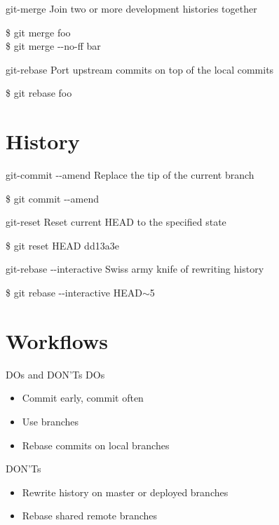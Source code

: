\documentclass{beamer}
\begin{document}
\begin{frame}{git-merge}
  Join two or more development histories together
  \begin{Example}
    \$ git merge foo \\
    \$ git merge -{}-no-ff bar
  \end{Example}
\end{frame}

\begin{frame}{git-rebase}
  Port upstream commits on top of the local commits
  \begin{Example}
    \$ git rebase foo
  \end{Example}
\end{frame}

\section{History}

\begin{frame}{git-commit -{}-amend}
  Replace the tip of the current branch
  \begin{Example}
    \$ git commit -{}-amend
  \end{Example}
\end{frame}

\begin{frame}{git-reset}
  Reset current HEAD to the specified state
  \begin{Example}
    \$ git reset HEAD dd13a3e
  \end{Example}
\end{frame}

\begin{frame}{git-rebase -{}-interactive}
  Swiss army knife of rewriting history
  \begin{Example}
    \$ git rebase -{}-interactive HEAD$\sim$5
  \end{Example}
\end{frame}

\section{Workflows}

\begin{frame}{DOs and DON'Ts}
  DOs
  \begin{itemize}
  \item Commit early, commit often
  \item Use branches
  \item Rebase commits on local branches
  \end{itemize}
  DON'Ts
  \begin{itemize}
  \item Rewrite history on master or deployed branches
  \item Rebase shared remote branches
  \end{itemize}
\end{frame}
\end{document}
